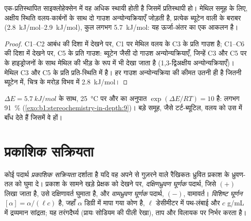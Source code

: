 \begin{proposition}[विषुवतीय प्रतिस्थापी वरीय होते हैं]\label{prop:b1:stereochemistry-in-depth:chair-substituent}
एक-प्रतिस्थापित साइक्लोहेक्सेन में वह  अधिक स्थायी होती है जिसमें प्रतिस्थापी
 हो। मेथिल समूह के लिए, अक्षीय स्थिति वलय-कार्बनों के साथ
दो गाउश अन्योन्यक्रियाएँ जोड़ती है, प्रत्येक ब्यूटेन वाली के बराबर
(\qtyrange{2.8}{2.9}{kJ/mol}), कुल लगभग \qty{5.7}{kJ/mol}: यह
ऊर्जा-अंतर का एक आकलन है।
\end{proposition}

\begin{proof}
C1--C2 आबंध की दिशा में देखने पर, C1 पर  मेथिल वलय के C3 के प्रति गाउश
है; C1--C6 की दिशा में देखने पर, C5 के प्रति गाउश: ब्यूटेन जैसी दो गाउश
अन्योन्यक्रियाएँ, जिन्हें C3 और C5 पर के  हाइड्रोजनों के साथ मेथिल की
भीड़ के रूप में भी देखा जाता है (1,3-द्विअक्षीय अन्योन्यक्रियाएँ)।
 मेथिल C3 और C5 के प्रति प्रति-स्थिति में है। हर गाउश अन्योन्यक्रिया की
कीमत उतनी ही है जितनी ब्यूटेन में, चित्र के मरोड़ विभव में \qty{2.8}{kJ/mol}।
\end{proof}

$\Delta E = \qty{5.7}{kJ/mol}$ के साथ, \qty{25}{\celsius} पर  और 
 का अनुपात $\exp(\Delta E/RT) = 10$ है: लगभग
\qty{91}{\percent}  (\cref{exo:b1:stereochemistry-in-depth:9})।
बड़े समूह, जैसे टर्ट-ब्यूटिल, वलय को उस  में बाँध देते हैं जिसमें वे
 हों।

\section{प्रकाशिक सक्रियता}

\begin{definition}[प्रकाशिक सक्रियता, विशिष्ट घूर्णन]\label{def:b1:stereochemistry-in-depth:optical-activity}
कोई पदार्थ \emph{प्रकाशिक सक्रियता} दर्शाता है यदि वह
अपने से गुज़रने वाले रैखिकतः ध्रुवित प्रकाश के ध्रुवण-तल को
घुमा दे। प्रकाश के सामने खड़े प्रेक्षक को देखने पर,
\emph{दक्षिणध्रुवण घूर्णक} पदार्थ, जिसे $(+)$ लिखा जाता है,
उसे दक्षिणावर्त घुमाता है, और \emph{वामध्रुवण घूर्णक} पदार्थ,
$(-)$, वामावर्त। \emph{विशिष्ट घूर्णन}
$[\alpha] = \alpha/(\ell c)$ है, जहाँ $\alpha$ डिग्री में मापा गया
कोण है, $\ell$ डेसीमीटर में पथ-लंबाई और $c$ \unit{g/mL} में द्रव्यमान
सांद्रता; यह तरंगदैर्घ्य (प्रायः सोडियम की पीली रेखा), ताप और
विलायक पर निर्भर करता है।
\end{definition}

